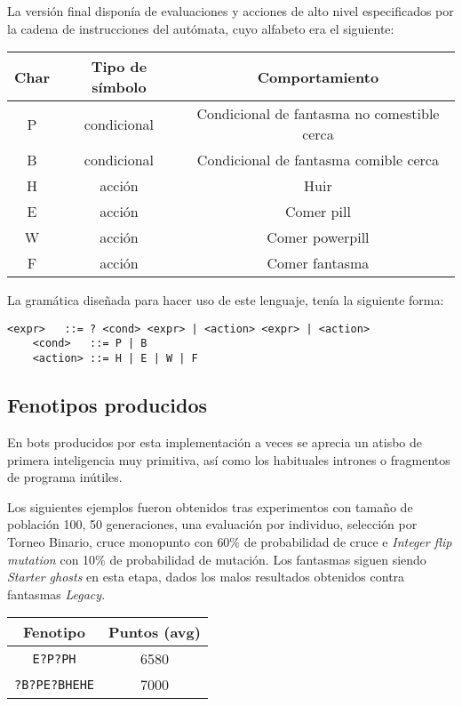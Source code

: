 \blankline

La versión final disponía de evaluaciones y acciones de alto nivel especificados por la cadena de instrucciones del autómata, cuyo alfabeto era el siguiente:
\begin{table}[H]
\centering
\begin{tabular}{ccc}
\hline
\textbf{Char} & \textbf{Tipo de símbolo} & \textbf{Comportamiento}                     \\ \hline
P             & condicional              & Condicional de fantasma no comestible cerca \\
B             & condicional              & Condicional de fantasma comible cerca       \\
H             & acción                   & Huir                                        \\
E             & acción                   & Comer pill                                  \\
W             & acción                   & Comer powerpill                             \\
F             & acción                   & Comer fantasma                              \\ \hline
\end{tabular}
\end{table}

La gramática diseñada para hacer uso de este lenguaje, tenía la siguiente forma:
\begin{lstlisting}[frame=single, breaklines=no, basicstyle=\fontsize{10}{11}\ttfamily]
    <expr>   ::= ? <cond> <expr> | <action> <expr> | <action>
    <cond>   ::= P | B
    <action> ::= H | E | W | F
\end{lstlisting}

\subsection{Fenotipos producidos}
En bots producidos por esta implementación a veces se aprecia un atisbo de primera inteligencia muy primitiva, así como los habituales intrones o fragmentos de programa inútiles.
 
Los siguientes ejemplos fueron obtenidos tras experimentos con tamaño de población 100, 50 generaciones, una evaluación por individuo, selección por Torneo Binario, cruce monopunto con 60\% de probabilidad de cruce e \textit{Integer flip mutation} con 10\% de probabilidad de mutación. Los fantasmas siguen siendo \textit{Starter ghosts} en esta etapa, dados los malos resultados obtenidos contra fantasmas \textit{Legacy}.
\begin{table}[H]
\centering
\begin{tabular}{cc}
\hline
\textbf{Fenotipo} & \textbf{Puntos (avg)} \\ \hline
\texttt{E?P?PH}          & 6580                  \\
\texttt{?B?PE?BHEHE}          & 7000                  \\ \hline
\end{tabular}
\end{table}

